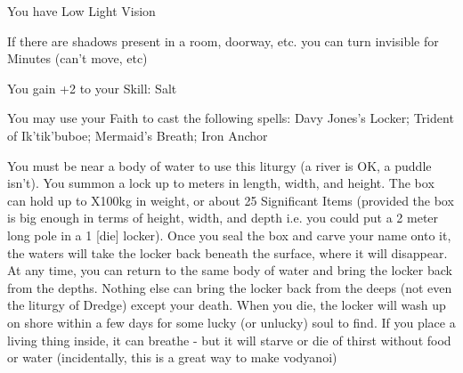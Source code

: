 {\GOD[
Name=Erebus,
Link=small-god-erebus,
GodOf=Lord of Shadows,
Holy=a piece of black gauze covering the mouth
]


You have Low Light Vision


If there are shadows present in a room, doorway, etc. you can turn invisible for \SUMDICE Minutes (can't move, etc)




\GOD[
Name=Ik'tik'buboe,
Link=small-god-ik'tik'buboe,
GodOf=The Drowned Sultan,
Holy=a necklace made from crab's claws and nautical rope tied in elaborate knots
]


You gain +2 to your Skill: Salt


You may use your Faith to cast the following spells: Davy Jones's Locker; Trident of Ik'tik'buboe; Mermaid's Breath; Iron Anchor

\LITURGY [
  Name= Davy Jones-Locker,
  Link= ikitikbubuoe-liturgy-davy-jones-locker,
  Paradigm= Prophesy ,
  Save=  N ,
  Duration= 0 ,
  Counter=  n/a  ,
  Keywords= None ,
  Target=   Close body of water
]



You must be near a body of water to use this liturgy (a river is OK, a puddle isn't).  You summon a lock up to \DICE meters in length, width, and height.  The box can hold up to \DICE X100kg in weight, or about 25 Significant Items (provided the box is big enough in terms of height, width, and depth i.e. you could put a 2 meter long pole in a 1 [die] locker).  Once you seal the box and carve your name onto it, the waters will take the locker back beneath the surface, where it will disappear.  At any time, you can return to the same body of water and bring the locker back from the depths. Nothing else can bring the locker back from the deeps (not even the liturgy of Dredge) except your death.  When you die, the locker will wash up on shore within a few days for some lucky (or unlucky) soul to find.
If you place a living thing inside, it can breathe - but it will starve or die of thirst without food or water (incidentally, this is a great way to make vodyanoi)
\LITURGY [
  Name= Iron Anchor,
  Link=ikitikbubuoe-liturgy-liturgy-iron-anchor,
  Paradigm= Force ,
  Save=  N ,
  Duration= \SUMDICE Minutes ,
  Counter=  n/a  ,
  Keywords= None ,
  Target=   Close (touch)
]



}
